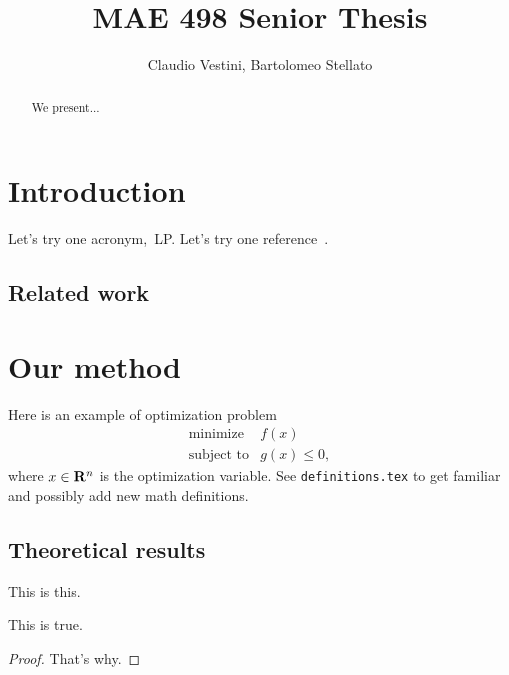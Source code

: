 \documentclass[12pt]{article}
\title{ MAE 498 Senior Thesis }
\author{ Claudio Vestini, Bartolomeo Stellato }
\begin{document}
\maketitle

\begin{abstract}
We present...
\end{abstract}



\section{Introduction}

Let's try one acronym,~\gls{LP}. Let's try one reference~\cite{conforti2014}.



\subsection{Related work}

\section{Our method}

Here is an example of optimization problem
\begin{equation*}
	\begin{array}{ll}
		\text{minimize} & f(x)\\
		\text{subject to} & g(x)\le 0,
	\end{array}
\end{equation*}
where $x \in {\mathbf R}^n$ is the optimization variable.
See {\tt definitions.tex} to get familiar and possibly add new math definitions.



\subsection{Theoretical results}%
\label{sub:theoretical_results}


\begin{definition}
	This is this.
\end{definition}


\begin{theorem}
	This is true.
\end{theorem}
\begin{proof}
	That's why.
\end{proof}
\end{document}
